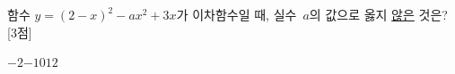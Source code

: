 함수 $y=(2-x)^2-ax^2+3x$가 이차함수일 때, 실수~$a$의 값으로 옳지 \underline{않은} 것은? \mbox{[3점]}
\begin{choices32}{$-2$}{$-1$}{$0$}{$1$}{$2$}\end{choices32}
